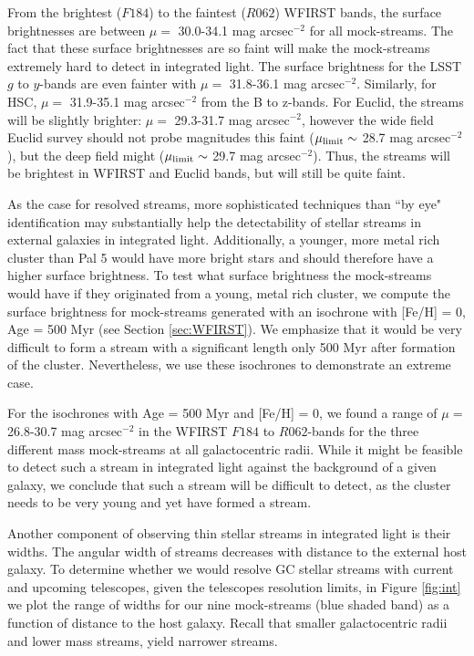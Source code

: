 \documentclass[twocolumn]{aastex62}
\begin{document}
From the brightest ($F184$) to the faintest ($R062$) WFIRST bands, the surface brightnesses are between $\mu =$ 30.0-34.1 mag arcsec$^{-2}$ for all mock-streams.  The fact that these surface brightnesses are so faint will make the mock-streams extremely hard to detect in integrated light. The surface brightness for the LSST $g$ to $y$-bands are even fainter with $\mu =$ 31.8-36.1 mag arcsec$^{-2}$. Similarly, for HSC,  $\mu =$ 31.9-35.1 mag arcsec$^{-2}$ from the B to z-bands. For Euclid, the streams will be slightly brighter: $\mu =$ 29.3-31.7 mag arcsec$^{-2}$, however the wide field Euclid survey should not probe magnitudes this faint ($\mu_{\rm limit} \sim$ 28.7 mag arcsec$^{-2}$), but the deep field might ($\mu_{\rm limit} \sim$ 29.7 mag arcsec$^{-2}$).  Thus, the streams will be brightest in WFIRST and Euclid bands, but will still be quite faint. 

As the case for resolved streams, more sophisticated techniques than ``by eye" identification may substantially help the detectability of stellar streams in external galaxies in integrated light. Additionally, a younger, more metal rich cluster than Pal 5 would have more bright stars and should therefore have a higher surface brightness. To test what surface brightness the mock-streams would have if they originated from a young, metal rich cluster, we compute the surface brightness for mock-streams generated with an isochrone with [Fe/H] =  0, Age = 500 Myr (see Section \ref{sec:WFIRST}). We emphasize that it would be very difficult to form a stream with a significant length only 500 Myr after formation of the cluster. Nevertheless, we use these isochrones to demonstrate an extreme case. 

For the isochrones with Age = 500 Myr and  [Fe/H] =  0, we found a range of $\mu =$ 26.8-30.7 mag arcsec$^{-2}$ in the WFIRST $F184$ to $R062$-bands for the three different mass mock-streams at all galactocentric radii. While it might be feasible to detect such a stream in integrated light against the background of a given galaxy, we conclude that such a stream will be difficult to detect, as the cluster needs to be very young and yet have formed a stream.

Another component of observing thin stellar streams in integrated light is their widths. The angular width of streams decreases with distance to the external host galaxy. To determine whether we would resolve GC stellar streams with current and upcoming telescopes, given the telescopes resolution limits, in Figure \ref{fig:int} we plot the range of widths for our nine mock-streams (blue shaded band) as a function of distance to the host galaxy. Recall that smaller galactocentric radii and lower mass streams, yield narrower streams.
\end{document}
